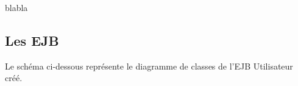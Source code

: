 \documentclass[10pt]{report}
\begin{document}
	\begin{figure}[here]
	      \begin{center}	      
	      \end{center}
	\end{figure}
blabla

\newpage
\subsection{Les EJB}

Le schéma ci-dessous représente le diagramme de classes de l'EJB Utilisateur créé.
\\
	\begin{figure}[hp]
	      \begin{center}
	      \end{center}
	\end{figure}
\\
\end{document}

